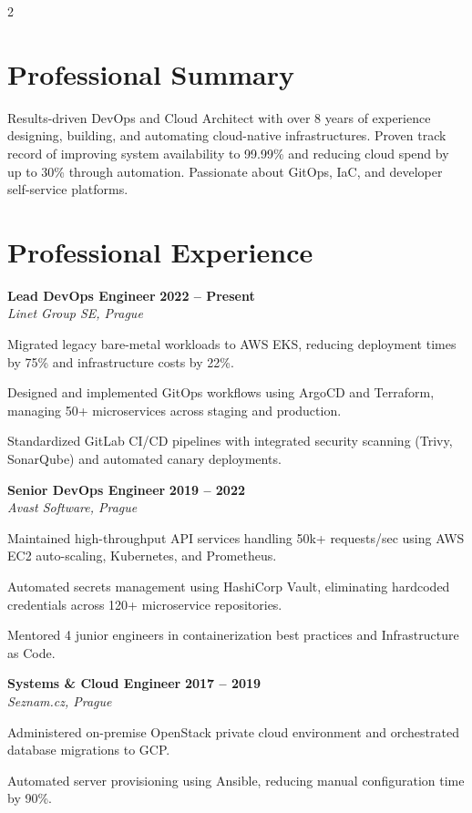 \documentclass[10pt,a4paper]{article}
\newcommand{\jobentry}[4]{%
  \vspace{6pt}
  {\normalfont\large\bfseries\color{darkneutral} #1} \hfill {\normalfont\color{accent}\bfseries #2} \\
  {\normalfont\itshape\color{textgray} #3} \\
  \vspace{2pt}
  #4
  \vspace{4pt}
}
\begin{document}
\begin{paracol}{2}
  \switchcolumn
  
  \section{Professional Summary}
  Results-driven DevOps and Cloud Architect with over 8 years of experience designing, building, and automating cloud-native infrastructures. Proven track record of improving system availability to 99.99\% and reducing cloud spend by up to 30\% through automation. Passionate about GitOps, IaC, and developer self-service platforms.
  
  \section{Professional Experience}
  
  \jobentry{Lead DevOps Engineer}{2022 -- Present}{Linet Group SE, Prague}{%
    \begin{achievements}
      \item Migrated legacy bare-metal workloads to AWS EKS, reducing deployment times by 75\% and infrastructure costs by 22\%.
      \item Designed and implemented GitOps workflows using ArgoCD and Terraform, managing 50+ microservices across staging and production.
      \item Standardized GitLab CI/CD pipelines with integrated security scanning (Trivy, SonarQube) and automated canary deployments.
    \end{achievements}
  }
  
  \jobentry{Senior DevOps Engineer}{2019 -- 2022}{Avast Software, Prague}{%
    \begin{achievements}
      \item Maintained high-throughput API services handling 50k+ requests/sec using AWS EC2 auto-scaling, Kubernetes, and Prometheus.
      \item Automated secrets management using HashiCorp Vault, eliminating hardcoded credentials across 120+ microservice repositories.
      \item Mentored 4 junior engineers in containerization best practices and Infrastructure as Code.
    \end{achievements}
  }
  
  \jobentry{Systems \& Cloud Engineer}{2017 -- 2019}{Seznam.cz, Prague}{%
    \begin{achievements}
      \item Administered on-premise OpenStack private cloud environment and orchestrated database migrations to GCP.
      \item Automated server provisioning using Ansible, reducing manual configuration time by 90\%.
    \end{achievements}
  }
  

\end{paracol}
\end{document}
